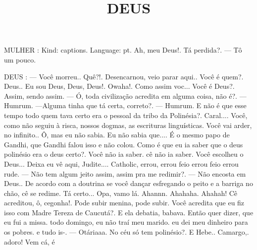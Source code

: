 \documentclass[10pt]{article}
\author{}
\title{\vspace{-3.5cm}DEUS}
\date{}
\newcommand{\mychar}[1]{
  \bigskip
  \hspace{-2em} \MakeUppercase{#1}
}
\begin{document}
\maketitle



\mychar{MULHER}: Kind: captions. Language: pt. Ah, meu Deus!. Tá perdida?. — Tô um pouco.

\mychar{DEUS}: — Você morreu.. Quê?!. Desencarnou, veio parar aqui.. Você é quem?. Deus.. Eu sou Deus, Deus, Deus!. Owaha!. Como assim voc... Você é Deus?. Assim, sendo assim. — Ó, toda civilização acredita em alguma coisa, não é?. — Humrum. —Alguma tinha que tá certa, correto?. — Humrum. E não é que esse tempo todo quem tava certo era o pessoal da tribo da Polinésia?. Caral.... Você, como não seguiu à risca, nossos dogmas, as escrituras linguísticas. Você vai arder, no infinito.. Ô, mas eu não sabia. Eu não sabia que.... É o mesmo papo de Gandhi, que Gandhi falou isso e não colou. Como é que eu ia saber que o deus polinésio era o deus certo?. Você não ia saber. cê não ia saber. Você escolheu o Deus... Deixa eu vê aqui, Judite.... Catholic, errou, errou feio errou feio errou rude. — Não tem algum jeito assim, assim pra me redimir?. — Não encosta em Deus.. De acordo com a doutrina se você dançar esfregando  o peito e a barriga no chão, cê se redime. Tá certo... Opa, vamo lá. Ahannn. Ahahaha. Ahahah! Cê acreditou, ô, cegonha!. Pode subir menina, pode subir. Você acredita que eu fiz isso com Madre Tereza de Caucutá?. E ela debatia, babava. Então quer dizer, que eu fui a missa. todo domingo, eu não traí meu marido. eu dei meu dinheiro para os pobres. e tudo is-. — Otáriaaa. No céu só tem polinésio?. E Hebe.. Camargo,. adoro!  Vem cá, é
\end{document}
